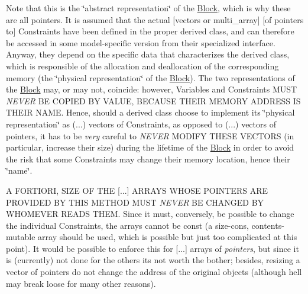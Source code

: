 Note that this is the \char`\"{}abstract representation\char`\"{} of the \mbox{\hyperlink{class_s_m_spp__di__unipi__it_1_1_block}{Block}}, which is why these are all pointers. It is assumed that the actual \mbox{[}vectors or multi\+\_\+array\mbox{]} \mbox{[}of pointers to\mbox{]} Constraints have been defined in the proper derived class, and can therefore be accessed in some model-\/specific version from their specialized interface. Anyway, they depend on the specific data that characterizes the derived class, which is responsible of the allocation and deallocation of the corresponding memory (the \char`\"{}physical representation\char`\"{} of the \mbox{\hyperlink{class_s_m_spp__di__unipi__it_1_1_block}{Block}}). The two representations of the \mbox{\hyperlink{class_s_m_spp__di__unipi__it_1_1_block}{Block}} may, or may not, coincide\+: however, Variables and Constraints M\+U\+ST {\itshape N\+E\+V\+ER} BE C\+O\+P\+I\+ED BY V\+A\+L\+UE, B\+E\+C\+A\+U\+SE T\+H\+E\+IR M\+E\+M\+O\+RY A\+D\+D\+R\+E\+SS IS T\+H\+E\+IR N\+A\+ME. Hence, should a derived class choose to implement its \char`\"{}physical
   representation\char`\"{} as (...) vectors of Constraints, as opposed to (...) vectors of pointers, it has to be {\itshape very} careful to {\itshape N\+E\+V\+ER} M\+O\+D\+I\+FY T\+H\+E\+SE V\+E\+C\+T\+O\+RS (in particular, increase their size) during the lifetime of the \mbox{\hyperlink{class_s_m_spp__di__unipi__it_1_1_block}{Block}} in order to avoid the risk that some Constraints may change their memory location, hence their \char`\"{}name\char`\"{}.

A F\+O\+R\+T\+I\+O\+RI, S\+I\+ZE OF T\+HE \mbox{[}...\mbox{]} A\+R\+R\+A\+YS W\+H\+O\+SE P\+O\+I\+N\+T\+E\+RS A\+RE P\+R\+O\+V\+I\+D\+ED BY T\+H\+IS M\+E\+T\+H\+OD M\+U\+ST {\itshape N\+E\+V\+ER} BE C\+H\+A\+N\+G\+ED BY W\+H\+O\+M\+E\+V\+ER R\+E\+A\+DS T\+H\+EM. Since it must, conversely, be possible to change the individual Constraints, the arrays cannot be const (a size-\/cons, contents-\/mutable array should be used, which is possible but just too complicated at this point). It would be possible to enforce this for \mbox{[}...\mbox{]} arrays of {\itshape pointers}, but since it is (currently) not done for the others it\textquotesingle{}s not worth the bother; besides, resizing a vector of pointers do not change the address of the original objects (although hell may break loose for many other reasons).

